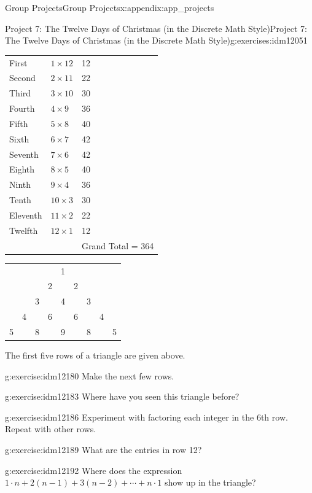 \documentclass[oneside,10pt,]{book}
\numberwithin{equation}{chapter}
\begin{document}
\begin{appendixptx}{Group Projects}{}{Group Projects}{}{}{x:appendix:app_projects}
\begin{exercises-section-numberless}{Project 7: The Twelve Days of Christmas (in the Discrete Math Style)}{}{Project 7: The Twelve Days of Christmas (in the Discrete Math Style)}{}{}{g:exercises:idm12051}
\begin{introduction}{}
\begin{sidebyside}{1}{0.2}{0.2}{0}
\begin{sbspanel}{0.6}
{\begin{tabular}{lll}
First&\(1 \times 12\)&12\tabularnewline[0pt]
Second&\(2 \times 11\)&22\tabularnewline[0pt]
Third&\(3 \times 10\)&30\tabularnewline[0pt]
Fourth&\(4 \times 9\)&36\tabularnewline[0pt]
Fifth&\(5 \times 8\)&40\tabularnewline[0pt]
Sixth&\(6 \times 7\)&42\tabularnewline[0pt]
Seventh&\(7 \times 6\)&42\tabularnewline[0pt]
Eighth&\(8 \times 5\)&40\tabularnewline[0pt]
Ninth&\(9 \times 4\)&36\tabularnewline[0pt]
Tenth&\(10 \times 3\)&30\tabularnewline[0pt]
Eleventh&\(11 \times 2\)&22\tabularnewline[0pt]
Twelfth&\(12 \times 1\)&12\tabularnewline[0pt]
&&Grand Total = 364
\end{tabular}
\par}
\end{sbspanel}%
\end{sidebyside}%
\begin{sidebyside}{1}{0.1}{0.1}{0}%
\begin{sbspanel}{0.8}%
{\centering%
\begin{tabular}{lllllllll}
&&&&1&&&&\tabularnewline[0pt]
&&&2&&2&&&\tabularnewline[0pt]
&&3&&4&&3&&\tabularnewline[0pt]
&4&&6&&6&&4&\tabularnewline[0pt]
5&&8&&9&&8&&5
\end{tabular}
\par}
\end{sbspanel}%
\end{sidebyside}%
\par
The first five rows of a triangle are given above.%
\end{introduction}%
\begin{divisionexercise}{1}{}{}{g:exercise:idm12180}%
Make the next few rows.%
\end{divisionexercise}%
\begin{divisionexercise}{2}{}{}{g:exercise:idm12183}%
Where have you seen this triangle before?%
\end{divisionexercise}%
\begin{divisionexercise}{3}{}{}{g:exercise:idm12186}%
Experiment with factoring each integer in the 6th row. Repeat with other rows.%
\end{divisionexercise}%
\begin{divisionexercise}{4}{}{}{g:exercise:idm12189}%
What are the entries in row 12?%
\end{divisionexercise}%
\begin{divisionexercise}{5}{}{}{g:exercise:idm12192}%
Where does the expression \(1 \cdot n + 2\left( n - 1 \right) + 3\left( n - 2 \right) + \cdots + n \cdot 1\) show up in the triangle?%
\end{divisionexercise}%

\end{exercises-section-numberless}
\end{appendixptx}
\end{document}
